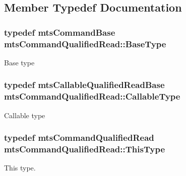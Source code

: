 \subsection{Member Typedef Documentation}
\hypertarget{classmts_command_qualified_read_a594530e3533708ab5f6535c5ccf6addd}{
\subsubsection[{Base\-Type}]{\setlength{\rightskip}{0pt plus 5cm}typedef {\bf mts\-Command\-Base} {\bf mts\-Command\-Qualified\-Read\-::\-Base\-Type}}}\label{classmts_command_qualified_read_a594530e3533708ab5f6535c5ccf6addd}
Base type \hypertarget{classmts_command_qualified_read_a95ca582ba302ac597fb9106a8270cce5}{
\subsubsection[{Callable\-Type}]{\setlength{\rightskip}{0pt plus 5cm}typedef {\bf mts\-Callable\-Qualified\-Read\-Base} {\bf mts\-Command\-Qualified\-Read\-::\-Callable\-Type}}}\label{classmts_command_qualified_read_a95ca582ba302ac597fb9106a8270cce5}
Callable type \hypertarget{classmts_command_qualified_read_a360793a513215088a297832b6066f368}{
\subsubsection[{This\-Type}]{\setlength{\rightskip}{0pt plus 5cm}typedef {\bf mts\-Command\-Qualified\-Read} {\bf mts\-Command\-Qualified\-Read\-::\-This\-Type}}}\label{classmts_command_qualified_read_a360793a513215088a297832b6066f368}
This type. 

